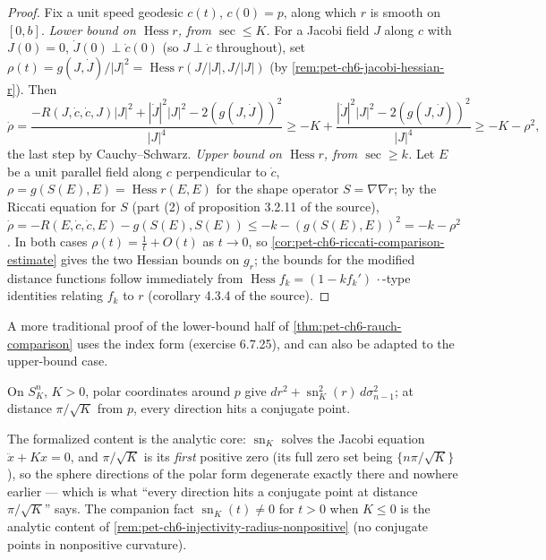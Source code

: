\begin{proof}
  Fix a unit speed geodesic $c(t)$, $c(0)=p$, along which $r$ is smooth on
  $[0,b]$. \emph{Lower bound on $\operatorname{Hess}r$, from $\sec\le K$.}
  For a Jacobi field $J$ along $c$ with $J(0)=0$,
  $\dot J(0)\perp\dot c(0)$ (so $J\perp\dot c$ throughout), set
  $\rho(t)=g(J,\dot J)/|J|^2=\operatorname{Hess}r(J/|J|,J/|J|)$ (by
  \cref{rem:pet-ch6-jacobi-hessian-r}). Then
  \[
    \dot\rho=\frac{-R(J,\dot c,\dot c,J)|J|^2+|\dot J|^2|J|^2-2(g(J,\dot J))^2}{|J|^4}
    \ge-K+\frac{|\dot J|^2|J|^2-2(g(J,\dot J))^2}{|J|^4}\ge-K-\rho^2,
  \]
  the last step by Cauchy--Schwarz.
  \emph{Upper bound on $\operatorname{Hess}r$, from $\sec\ge k$.} Let $E$ be a unit
  parallel field along $c$ perpendicular to $\dot c$, $\rho=g(S(E),E)=
  \operatorname{Hess}r(E,E)$ for the shape operator $S=\nabla\nabla r$; by the Riccati
  equation for $S$ (part (2) of proposition 3.2.11 of the source),
  $\dot\rho=-R(E,\dot c,\dot c,E)-g(S(E),S(E))\le-k-(g(S(E),E))^2=-k-\rho^2$.
  In both cases $\rho(t)=\tfrac1t+O(t)$ as $t\to0$, so
  \cref{cor:pet-ch6-riccati-comparison-estimate} gives the two Hessian
  bounds on $g_r$; the bounds for the modified distance functions follow
  immediately from $\operatorname{Hess}f_k=(1-kf_k')\,\cdot$-type identities relating
  $f_k$ to $r$ (corollary 4.3.4 of the source).
\end{proof}

\begin{remark}
  \label{rem:pet-ch6-index-form-remark}
  A more traditional proof of the lower-bound half of
  \cref{thm:pet-ch6-rauch-comparison} uses the index form (exercise 6.7.25),
  and can also be adapted to the upper-bound case.
\end{remark}

\begin{example}
  \label{ex:pet-ch6-conjugate-point-space-form}
  \leanok
  On $S^n_K$, $K>0$, polar coordinates around $p$ give
  $dr^2+\operatorname{sn}_K^2(r)\,d\sigma_{n-1}^2$; at distance $\pi/\sqrt K$ from $p$,
  every direction hits a conjugate point.

  The formalized content is the analytic core: $\operatorname{sn}_K$ solves the
  Jacobi equation $\ddot x+Kx=0$, and $\pi/\sqrt K$ is its \emph{first} positive
  zero (its full zero set being $\{n\pi/\sqrt K\}$), so the sphere directions of
  the polar form degenerate exactly there and nowhere earlier — which is what
  ``every direction hits a conjugate point at distance $\pi/\sqrt K$'' says. The
  companion fact $\operatorname{sn}_K(t)\ne0$ for $t>0$ when $K\le0$ is the
  analytic content of \cref{rem:pet-ch6-injectivity-radius-nonpositive}
  (no conjugate points in nonpositive curvature).
\end{example}

